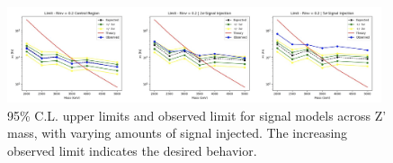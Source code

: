 \begin{figure}[!htbp]
\centering
   \includegraphics[width=0.98\textwidth]{figures/stats/lim_sig_inj}
    \caption{95\% C.L. upper limits and observed limit for signal models across Z' mass, with varying amounts of signal injected. The increasing observed limit indicates the desired behavior.
    \label{fig:lim_sig_inj}}
\end{figure}

\clearpage
